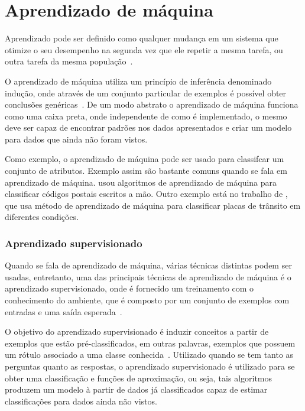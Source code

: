 \chapter{Aprendizado de máquina}

Aprendizado pode ser definido como qualquer mudança em um sistema que
otimize o seu desempenho na segunda vez que ele repetir a mesma tarefa,
ou outra tarefa da mesma população~\cite{custodio2010aprendizadomaquina}.

O aprendizado de máquina utiliza um princípio de inferência denominado
indução, onde através de um conjunto particular de exemplos é possível
obter conclusões genéricas~\cite{bruno2010aprendizadomaquina}. De um modo
abstrato o aprendizado de máquina funciona como uma caixa preta, onde
independente de como é implementado, o mesmo deve ser capaz de encontrar padrões
nos dados apresentados e criar um modelo para dados que ainda não foram vistos.

Como exemplo, o aprendizado de máquina pode ser usado para classifcar
um conjunto de atributos. Exemplo assim são bastante comuns quando se fala em
aprendizado de máquina.  usou algoritmos de
aprendizado de máquina para classificar códigos postais escritos a mão. Outro
exemplo está no trabalho de , que usa método de
aprendizado de máquina para classificar placas de trânsito em diferentes
condições.


\subsection{Aprendizado supervisionado}

Quando se fala de aprendizado de máquina, várias técnicas distintas podem ser
usadas, entretanto, uma das principais técnicas de aprendizado de máquina é o aprendizado
supervisionado, onde é fornecido um treinamento com o conhecimento do
ambiente, que é composto por um conjunto de exemplos com entradas
e uma saída esperada~\cite{bruno2010aprendizadomaquina}.

O objetivo do aprendizado supervisionado é induzir conceitos a partir de
exemplos que estão pré-classificados, em outras palavras, exemplos que
possuem um rótulo associado a uma classe conhecida~\cite{bruno2010aprendizadomaquina}.
Utilizado quando se tem tanto as perguntas quanto as respostas, o aprendizado
supervisionado é utilizado para se obter uma classificação e funções de aproximação, ou seja,
tais algoritmos produzem um modelo à partir de dados já classificados capaz de estimar classificações
para dados ainda não vistos.

